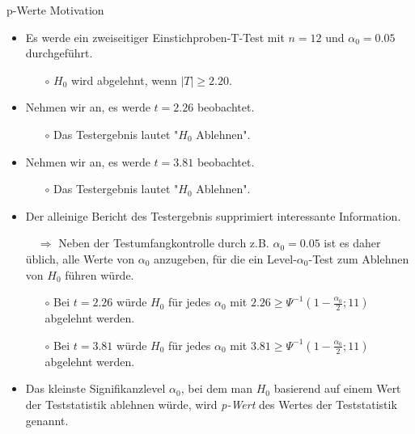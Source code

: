 \documentclass[
  8pt,
  ignorenonframetext,
]{beamer}
\begin{document}
\begin{frame}{p-Werte}
\protect\hypertarget{p-werte}{}
Motivation

\small
\begin{itemize}
\justifying
\item  Es werde ein zweiseitiger Einstichproben-T-Test mit $n = 12$ und $\alpha_0 = 0.05$ durchgeführt.
\begin{itemize}
\small
\item[$\circ$]  $H_0$ wird abgelehnt, wenn $|T| \ge 2.20$.
\end{itemize}
\item Nehmen wir an, es werde $t = 2.26$ beobachtet.
\begin{itemize}
\small
\item[$\circ$] Das Testergebnis lautet "$H_0$ Ablehnen".
\end{itemize}
\item Nehmen wir an, es werde $t = 3.81$ beobachtet.
\begin{itemize}
\small
\item[$\circ$] Das Testergebnis lautet "$H_0$ Ablehnen".
\end{itemize}
\item Der alleinige Bericht des Testergebnis supprimiert interessante Information.
\item[$\quad \Rightarrow$] Neben der Testumfangkontrolle durch z.B. $\alpha_0 = 0.05$
ist es daher üblich, alle Werte von $\alpha_0$ anzugeben, für die ein
Level-$\alpha_0$-Test zum Ablehnen von $H_0$ führen würde.
\begin{itemize}
\justifying
\small
\item[$\circ$] Bei $t = 2.26$ würde $H_0$ für jedes $\alpha_0$ mit $2.26 \ge \Psi^{-1}\left(1-\frac{\alpha_0}{2};11\right)$ abgelehnt werden.
\item[$\circ$] Bei $t = 3.81$ würde $H_0$ für jedes $\alpha_0$ mit $3.81 \ge \Psi^{-1}\left(1-\frac{\alpha_0}{2};11\right)$ abgelehnt werden.
\end{itemize}
\item Das kleinste Signifikanzlevel $\alpha_0$, bei dem man $H_0$ basierend auf
einem Wert der Teststatistik ablehnen würde, wird \textit{p-Wert} des Wertes 
der Teststatistik genannt.
\end{itemize}
\end{frame}
\end{document}
